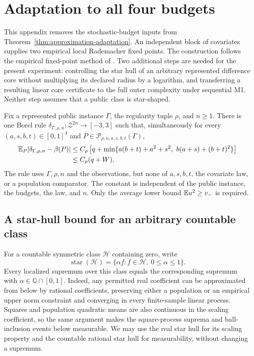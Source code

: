 \section{Adaptation to all four budgets}
\label{app:stochastic-adaptation}

This appendix removes the stochastic-budget inputs from
Theorem~\ref{thm:approximation-adaptation}. An independent block of
covariates supplies two empirical local Rademacher fixed points. The
construction follows the empirical fixed-point method of
\citet{bartlett2005local}. Two additional steps are needed for the present
experiment: controlling the star hull of an arbitrary represented
difference core without multiplying its declared radius by a logarithm,
and transferring a resulting linear core certificate to the full outer
complexity under sequential M1. Neither step assumes that a public class
is star-shaped.

\begin{theorem}
\label{thm:full-budget-adaptation}
Fix a represented public instance $\Gamma$, the regularity tuple $\rho$,
and $n\ge1$. There is one Borel rule
$\delta_{\Gamma,\rho,n}:\mathcal Z^{2n}\to[-3,3]$ such that,
simultaneously for every $(a,s,b,t)\in[0,1]^4$ and
$P\in\mathcal P_{\rho,n,a,s,b,t}(\Gamma)$,
\begin{equation}
 \begin{split}
 \mathbb E_P|\delta_{\Gamma,\rho,n}-\beta(P)|
 &\le C_\rho\left[q+
 \min\{a(b+t)+a^2+s^2,\ b(a+s)+(b+t)^2\}\right]\\
 &\le C_\rho(q+W).
 \end{split}
 \label{eq:full-budget-adaptation-rate}
\end{equation}
The rule uses $\Gamma,\rho,n$ and the observations, but none of
$a,s,b,t$, the covariate law, or a population comparator. The constant
is independent of the public instance, the budgets, the law, and $n$.
Only the average lower bound $\mathbb E u^2\ge v_-$ is required.
\end{theorem}

\subsection{A star-hull bound for an arbitrary countable class}
\label{app:stochastic-star}

For a countable symmetric class $\mathcal H$ containing zero, write
\[
 \operatorname{star}(\mathcal H)
 =\{\alpha f:f\in\mathcal H,\ 0\le\alpha\le1\}.
\]
Every localized supremum over this class equals the corresponding
supremum with $\alpha\in\mathbb Q\cap[0,1]$. Indeed, any permitted
real coefficient can be approximated from below by rational
coefficients, preserving either a population or an empirical upper
norm constraint and converging in every finite-sample linear process.
Squares and population quadratic means are also continuous in the
scaling coefficient, so the same argument makes the square-process
suprema and ball-inclusion events below measurable. We may use the real star hull
for its scaling property and the countable rational star hull for
measurability, without changing a supremum.

